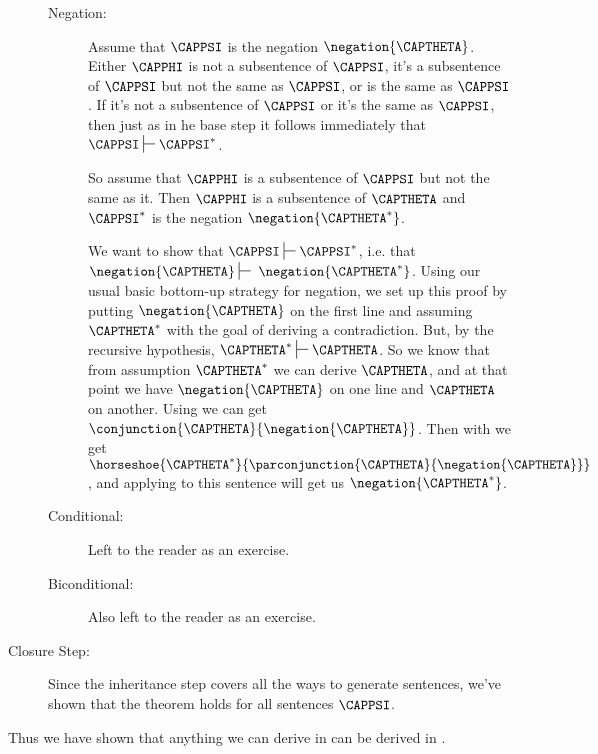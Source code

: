 \begin{PROOF}
\begin{description}
\begin{description}
\item[Negation:] Assume that $\CAPPSI$ is the negation $\negation{\CAPTHETA}$. 
Either $\CAPPHI$ is not a subsentence of $\CAPPSI$, it's a subsentence of $\CAPPSI$ but not the same as $\CAPPSI$, or is the same as $\CAPPSI$. 
If it's not a subsentence of $\CAPPSI$ or it's the same as $\CAPPSI$, then just as in he base step it follows immediately that $\CAPPSI\sststile{}{}\CAPPSI^*$.

So assume that $\CAPPHI$ is a subsentence of $\CAPPSI$ but not the same as it. 
Then $\CAPPHI$ is a subsentence of $\CAPTHETA$ and $\CAPPSI^*$ is the negation $\negation{\CAPTHETA^*}$.

We want to show that $\CAPPSI\sststile{}{}\CAPPSI^*$, i.e. that $\negation{\CAPTHETA}\sststile{}{}\;\negation{\CAPTHETA^*}$. Using our usual basic bottom-up strategy for negation, we set up this proof by putting $\negation{\CAPTHETA}$ on the first line and assuming $\CAPTHETA^*$ with the goal of deriving a contradiction. But, by the recursive hypothesis, $\CAPTHETA^*\sststile{}{}\CAPTHETA$. So we know that from assumption $\CAPTHETA^*$ we can derive $\CAPTHETA$, and at that point we have $\negation{\CAPTHETA}$ on one line and $\CAPTHETA$ on another. Using  we can get $\conjunction{\CAPTHETA}{\negation{\CAPTHETA}}$. Then with  we get $\horseshoe{\CAPTHETA^*}{\parconjunction{\CAPTHETA}{\negation{\CAPTHETA}}}$, and applying  to this sentence will get us $\negation{\CAPTHETA^*}$. 

\item[Conditional:] Left to the reader as an exercise.

\item[Biconditional:] Also left to the reader as an exercise.

\end{description}
\item[Closure Step:] Since the inheritance step covers all the ways to generate \GSL{} sentences, we've shown that the theorem holds for all \GSL{} sentences $\CAPPSI$.  
\end{description}
\end{PROOF}

\noindent{}Thus we have shown that anything we can derive in \GSDP{} can be derived in \GSD{}.


